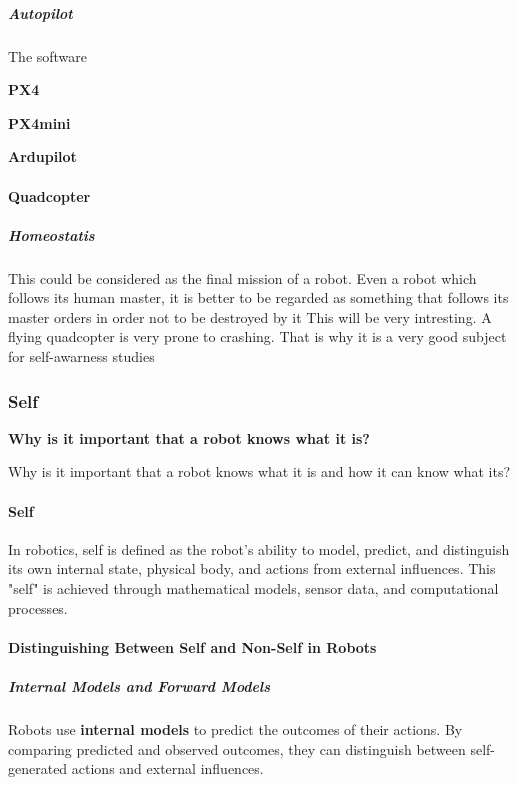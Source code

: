 \documentclass{book}
\providecommand{\ProjectDeepHeading}[2]{%
    \par\medskip\noindent\textbf{#2}\par\smallskip
}
\begin{document}
    
    \subparagraph{Autopilot}
    The software
    
    \ProjectDeepHeading{1}{PX4}
    
    \ProjectDeepHeading{1}{PX4mini}
    
    \ProjectDeepHeading{1}{Ardupilot}
    
\paragraph{Quadcopter}
    \subparagraph{Homeostatis}
    This could be considered as the final mission of a robot. Even a robot which follows its human master, it is better to be regarded as something that follows its master orders in order not to be destroyed by it
    This will be very intresting. A flying quadcopter is very prone to crashing. That is why it is a very good subject for self-awarness studies


\subsubsection{Self}


\ProjectDeepHeading{2}{Why is it important that a robot knows what it is?}
    Why is it important that a robot knows what it is and how it can know what its?

\paragraph{Self}
In robotics, self is defined as the robot's ability to model, predict, and distinguish its own internal state, physical body, and actions from external influences. This "self" is achieved through mathematical models, sensor data, and computational processes.


\paragraph{Distinguishing Between Self and Non-Self in Robots}

\subparagraph{Internal Models and Forward Models}
Robots use \textbf{internal models} to predict the outcomes of their actions. By comparing predicted and observed outcomes, they can distinguish between self-generated actions and external influences.
\end{document}
